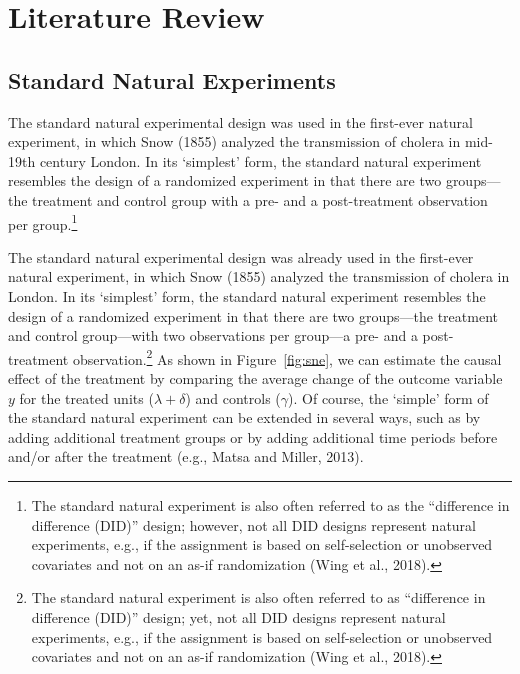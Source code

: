 \documentclass[english]{article}
\begin{document}
\section{Literature Review}\label{sec:descriptive_part}

\subsection{Standard Natural Experiments}

\noindent The standard natural experimental design was used in the first-ever
natural experiment, in which Snow (1855) analyzed the transmission of
cholera in mid-19th century London. In its `simplest' form, the standard
natural experiment resembles the design of a randomized experiment in
that there are two groups---the treatment and control group with a pre-
and a post-treatment observation per group.\footnote{The standard
  natural experiment is also often referred to as the ``difference in
  difference (DID)'' design; however, not all DID designs represent
  natural experiments, e.g., if the assignment is based on
  self-selection or unobserved covariates and not on an as-if
  randomization (Wing et al., 2018).}

The standard natural experimental design was already used in the first-ever
natural experiment, in which Snow (1855) analyzed the transmission of cholera in
London. In its `simplest' form, the standard natural experiment resembles the
design of a randomized experiment in that there are two groups---the treatment
and control group---with two observations per group---a pre- and a
post-treatment observation.\footnote{The standard natural experiment is also
	often referred to as ``difference in difference (DID)'' design; yet, not
all DID designs represent natural experiments, e.g., if the assignment is based
on self-selection or unobserved covariates and not on an as-if randomization
(Wing et al., 2018).} As shown in Figure~\ref{fig:sne}, we can estimate the
causal effect of the treatment by comparing the average change of the outcome
variable $y$ for the treated units ($\lambda + \delta$) and controls ($\gamma$).
Of course, the `simple' form of the standard natural experiment can be extended
in several ways, such as by adding additional treatment groups or by adding
additional time periods before and/or after the treatment (e.g., Matsa and
Miller, 2013).
\end{document}
